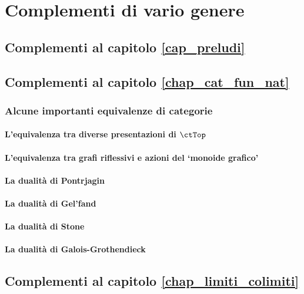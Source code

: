 \chapter{Complementi di vario genere}
\section{Complementi al capitolo \ref{cap_preludi}}
\section{Complementi al capitolo \ref{chap_cat_fun_nat}}
\subsection{Alcune importanti equivalenze di categorie}
\subsubsection{L'equivalenza tra diverse presentazioni di \(\ctTop\)}\label{equcat_top}
\subsubsection{L'equivalenza tra grafi riflessivi e azioni del `monoide grafico'}\label{equcat_gph}
\subsubsection{La dualità di Pontrjagin}\label{equcat_pontrjagin}
\subsubsection{La dualità di Gel'fand}\label{equcat_gelfand}
\subsubsection{La dualità di Stone}\label{equcat_stone}
\subsubsection{La dualità di Galois-Grothendieck}\label{equcat_galois_grothendieck}
\section{Complementi al capitolo \ref{chap_limiti_colimiti}}
